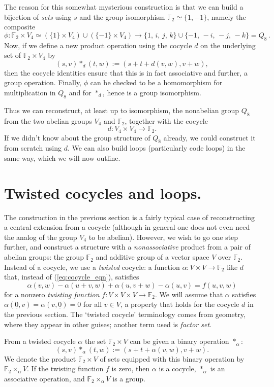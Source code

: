 \documentclass{article}
\theoremstyle{plain}
\theoremstyle{definition}
\def \FF {\mathbb{F}}
\begin{document}
The reason for this somewhat mysterious construction is that we can build a bijection of \emph{sets} using $s$ and the group isomorphism $\FF_2\simeq \{1,-1\}$, namely the composite
\[
	\phi\colon \FF_2\times V_4 \simeq \left(\{1\}\times V_4\right) \cup \left(\{-1\} \times V_4\right) \longrightarrow
	\{1,\, i,\, j,\, k\}\cup \{-1,\, -i,\, -j,\, -k\} = Q_8\,.
\]
Now, if we define a new product operation using the cocycle $d$ on the underlying set of $\FF_2\times V_4$ by
\[
	(s,v)\ast_d(t,w):=(s+ t+ d(v,w),v+w),
\]
then the cocycle identities ensure that this is in fact associative and further, a group operation.
Finally, $\phi$ can be checked to be a homomorphism for multiplication in $Q_8$ and for $\ast_d$, hence is a group isomorphism.

Thus we can reconstruct, at least up to isomorphism, the nonabelian group $Q_8$ from the two abelian groups $V_4$ and $\FF_2$, together with the cocycle
\[
	d\colon V_4\times V_4\to \FF_2.
\]
If we didn't know about the group structure of $Q_8$ already, we could construct it from scratch using $d$.
We can also build loops (particularly code loops) in the same way, which we will now outline.


\section{Twisted cocycles and loops.}

The construction in the previous section is a fairly typical case of reconstructing a central extension from a cocycle (although in general one does not even need the analog of the group $V_4$ to be abelian). 
However, we wish to go one step further, and construct a structure with a \emph{nonassociative} product from a pair of abelian groups: the group $\FF_2$ and additive group of a vector space $V$ over $\FF_2$.
Instead of a cocycle, we use a \emph{twisted} cocycle: a function $\alpha\colon V\times V \to \FF_2$ like $d$ that, instead of (\ref{eq:cocycle_eqn}), satisfies
\[
	\alpha(v,w)-\alpha(u+v,w)+\alpha(u,v+w)-\alpha(u,v) = f(u,v,w)
\]
for a nonzero \emph{twisting function} $f\colon V\times V\times V \to \FF_2$. We will assume that $\alpha$ satisfies $\alpha(\underline{0},v)=\alpha(v,\underline{0}) = 0$ for all $v\in V$, a property that holds for the cocycle $d$ in the previous section.
The `twisted cocycle' terminology comes from geometry, where they appear in other guises; another term used is \emph{factor set}.

From a twisted cocycle $\alpha$ the set $\FF_2 \times V$ can be given a binary operation $\ast_\alpha$:
\begin{equation}\label{eq:loop_extension_prod}
	(s,v)\ast_\alpha(t,w):=(s+ t+ \alpha(v,w),v+w).
\end{equation}
We denote the product $\FF_2 \times V$ of sets equipped with this binary operation by $\FF_2\times_\alpha V$. If the twisting function $f$ is zero, then $\alpha$ is a cocycle, $\ast_\alpha$ is an associative operation, and $\FF_2\times_\alpha V$ is a group.
\end{document}
